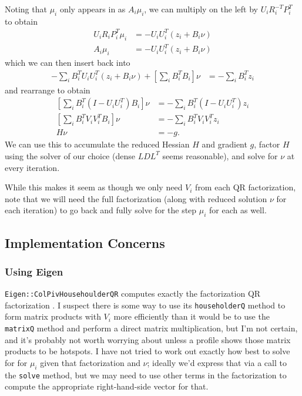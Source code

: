Noting that $\mu_i$ only appears in  as $A_i\mu_i$, we can multiply  on the left by $U_i R_i^{-T} P_i^T$ to obtain
\begin{align}
    U_i R_i P_i^T \mu_i &= -U_i U_i^T \left(z_i + B_i\nu\right) \\
    A_i \mu_i &= -U_i U_i^T \left(z_i + B_i\nu\right) \label{eq:vp_star_subproblem_qr_2}
\end{align}
which we can then insert back into 
\begin{align}
    -\sum_i B_i^T U_i U_i^T \left(z_i + B_i\nu\right) + \left[\sum_i B_i^T B_i\right]\nu &= -\sum_i B_i^T z_i
\end{align}
and rearrange to obtain
\begin{align}
    \left[\sum_i B_i^T \left(I - U_i U_i^T\right) B_i\right]\nu &=
        -\sum_i B_i^T \left(I - U_i U_i^T\right) z_i \\
    \left[\sum_i B_i^T V_i V_i^T B_i\right]\nu &=
        -\sum_i B_i^T V_i V_i^T z_i \\
    H\nu &= -g.
\end{align}
We can use this to accumulate the reduced Hessian $H$ and gradient $g$, factor $H$ using the solver of our choice (dense $LDL^T$ seems reasonable), and solve for $\nu$ at every iteration.

While this makes it seem as though we only need $V_i$ from each QR factorization, note that we will need the full factorization (along with reduced solution $\nu$ for each iteration) to go back and fully solve for the step $\mu_i$ for each  as well.

\subsection{Implementation Concerns}

\subsubsection{Using Eigen}

\texttt{Eigen::ColPivHousehoulderQR} computes exactly the factorization QR factorization .
I suspect there is some way to use its \texttt{householderQ} method to form matrix products with $V_i$ more efficiently than it would be to use the \texttt{matrixQ} method and perform a direct matrix multiplication, but I'm not certain, and it's probably not worth worrying about unless a profile shows those matrix products to be hotspots.
I have not tried to work out exactly how best to solve for for $\mu_i$ given that factorization and $\nu$; ideally we'd express that via a call to the \texttt{solve} method, but we may need to use other terms in the factorization to compute the appropriate right-hand-side vector for that.

